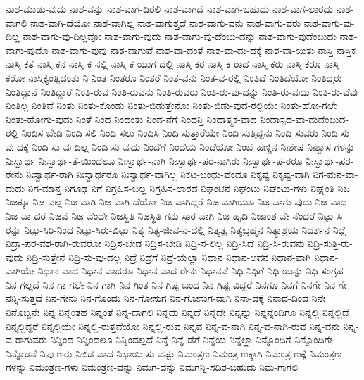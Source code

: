{ನಾಶ-ಮಾಡು-ವುದು
ನಾಶ-ವನ್ನು
ನಾಶ-ವಾಗ-ದಿರಲಿ
ನಾಶ-ವಾಗದೆ
ನಾಶ-ವಾಗ-ಬಹುದು
ನಾಶ-ವಾಗ-ಲಾರದು
ನಾಶ-ವಾಗಲಿ
ನಾಶ-ವಾಗಿ-ದೆಯೋ
ನಾಶ-ವಾಗಿಲ್ಲ
ನಾಶ-ವಾಗುತ್ತದೆ
ನಾಶ-ವಾಗು-ವನು
ನಾಶ-ವಾಗು-ವರು
ನಾಶ-ವಾಗು-ವು-ದಿಲ್ಲ
ನಾಶ-ವಾಗು-ವು-ದಿಲ್ಲವೋ
ನಾಶ-ವಾಗು-ವುದು
ನಾಶ-ವಾಗು-ವು-ದೆಂಬು-ದನ್ನು
ನಾಶ-ವಾಗು-ವುದೆಂಬುದು
ನಾಶ-ವಾಗು-ವುದೊ
ನಾಶ-ವಾಗು-ವುವು
ನಾಶ-ವಾಗುವೆ
ನಾಶ-ವಾ-ದಂತೆ
ನಾಶ-ವಾ-ದು-ದಕ್ಕೆ
ನಾಶ-ವಾ-ಯಿತು
ನಾಸ್ತಿ
ನಾಸ್ತಿಕ
ನಾಸ್ತಿ-ಕತೆ
ನಾಸ್ತಿ-ಕನ
ನಾಸ್ತಿ-ಕ-ನಲ್ಲಿ
ನಾಸ್ತಿ-ಕ-ಯುಗ-ದಲ್ಲಿ
ನಾಸ್ತಿ-ಕರ
ನಾಸ್ತಿ-ಕ-ರಾದ
ನಾಸ್ತಿ-ಕರು
ನಾಸ್ತಿ-ಕರೂ
ನಾಸ್ತಿ-ಕರೋ
ನಾಸ್ತಿಕ್ಯಂತ್ವಿದಂತು
ನಿ
ನಿಂತ
ನಿಂತರೂ
ನಿಂತರೆ
ನಿಂತ-ವನು
ನಿಂತ-ವ-ರಲ್ಲಿ
ನಿಂತಿದೆ
ನಿಂತಿದೆಯೋ
ನಿಂತಿದ್ದರು
ನಿಂತಿದ್ದಾನೆ
ನಿಂತಿದ್ದಾರೆ
ನಿಂತಿ-ರುವ
ನಿಂತಿ-ರುವನು
ನಿಂತಿ-ರುವರು
ನಿಂತಿ-ರು-ವು-ದನ್ನು
ನಿಂತಿ-ರು-ವುದು
ನಿಂತಿ-ರು-ವೆವು
ನಿಂತಿಲ್ಲ
ನಿಂತಿವೆ
ನಿಂತು
ನಿಂತು-ಕೊಂಡು
ನಿಂತು-ಬಿಡುತ್ತೇನೋ
ನಿಂತು-ಬಿಡು-ವುದ-ರಲ್ಲಿಯೇ
ನಿಂತು-ಹೋ-ಗಲೇ
ನಿಂತು-ಹೋಗು-ವುದು
ನಿಂತೆ
ನಿಂದ
ನಿಂದಂತು
ನಿಂದ-ನೆಗೆ
ನಿಂದನ್ತಿ
ನಿಂದಾತ್ಮಕ-ವಾದ
ನಿಂದಾಸ್ಪದ-ವಾ-ದುದೆಂಬುದ-ರಲ್ಲಿ
ನಿಂದಿಸ-ಬೇಡಿ
ನಿಂದಿ-ಸಲಿ
ನಿಂದಿ-ಸಲು
ನಿಂದಿಸಿ
ನಿಂದಿ-ಸುತ್ತಾರೆಯೇ
ನಿಂದಿ-ಸುತ್ತಿದ್ದನು
ನಿಂದಿ-ಸುವರು
ನಿಂದಿ-ಸು-ವು-ದಕ್ಕೆ
ನಿಂದಿ-ಸು-ವು-ದಿಲ್ಲ
ನಿಂದಿ-ಸು-ವುದು
ನಿಂದೆಗೆ
ನಿಂದೆಯ
ನಿಂದೆಯೋ
ನಿಂಬೆ-ಹಣ್ಣಿನ
ನಿಃಶೇಷ
ನಿಃಶ್ವಾಸ-ಗಳನ್ನು
ನಿಃಸ್ವಾರ್ಥ
ನಿಃಸ್ವಾರ್ಥ-ತೆ-ಯಿಂದಲೂ
ನಿಃಸ್ವಾರ್ಥ-ನಾಗಿ
ನಿಃಸ್ವಾರ್ಥ-ಪರ-ನಾಗಿರು
ನಿಃಸ್ವಾರ್ಥ-ಪ-ರರೂ
ನಿಃಸ್ವಾರ್ಥ-ಪರ-ರೇನು
ನಿಃಸ್ವಾರ್ಥ-ರಾಗಿ
ನಿಃಸ್ವಾರ್ಥರೂ
ನಿಃಸ್ವಾರ್ಥ-ವಾಗಿಲ್ಲ
ನಿಕಟ-ಬಂಧು-ವೆಂದೂ
ನಿಕೃಷ್ಟ
ನಿಕೃಷ್ಟ-ವಾಗಿ
ನಿಗ-ಮನ-ವಾ-ದುದು
ನಿಗ-ಮಾನ್ತ
ನಿಗೂಢ
ನಿಗೆ
ನಿಗ್ರಹಿಸ-ಬಲ್ಲ
ನಿಗ್ರಹಿಸ-ಲಾರದ
ನಿಘಂಟಿನ
ನಿಘಂಟು
ನಿಘಂಟು-ಗಳು
ನಿಘ್ನಂತಿ
ನಿಜ
ನಿಜಕ್ಕೂ
ನಿಜ-ವಲ್ಲ
ನಿಜ-ವಾಗಿ
ನಿಜ-ವಾಗಿ-ದೆಯೋ
ನಿಜ-ವಾಗಿದ್ದರೆ
ನಿಜ-ವಾಗಿಯೂ
ನಿಜ-ವಾಗು-ವುದು
ನಿಜ-ವಾದ
ನಿಜ-ವಾ-ದರೆ
ನಿಜವೆ
ನಿಜ-ವೆಂದೇ
ನಿಜಸ್ಥಿತಿ
ನಿಜಸ್ಥಿತಿ-ಗನು-ಸಾರ-ವಾಗಿ
ನಿಜ-ಹೃದಿ
ನಿಜಾಂಶ-ವೇ-ನೆಂದರೆ
ನಿಟ್ಟು-ಸಿ-ರನ್ನು
ನಿಟ್ಟು-ಸಿರಿ-ನಿಂದ
ನಿಟ್ಟು-ಸಿರು-ಬಿಟ್ಟು
ನಿತ್ಯ
ನಿತ್ಯ-ಜೀವ-ನ-ದಲ್ಲಿ
ನಿತ್ಯತ್ವ
ನಿತ್ಯಬ್ರಹ್ಮನ
ನಿತ್ಯಾಶ್ರಯ
ನಿದರ್ಶನ
ನಿದ್ದೆ
ನಿದ್ರಾ-ಪರ-ವಶ-ರಾಗಿ-ರುವರೋ
ನಿದ್ರಿಸ-ಬೇಡ
ನಿದ್ರಿಸ-ಬೇಡಿ
ನಿದ್ರಿ-ಸ-ಲಿಲ್ಲ
ನಿದ್ರಿ-ಸಿದೆ
ನಿದ್ರಿ-ಸಿ-ರುವನು
ನಿದ್ರಿ-ಸುತ್ತಿ-ರು-ವುದು
ನಿದ್ರಿ-ಸುತ್ತೇನೆ
ನಿದ್ರಿ-ಸು-ವು-ದಲ್ಲ
ನಿದ್ರೆ
ನಿದ್ರೆಗೆ
ನಿದ್ರೆ-ಯೆಲ್ಲಾ
ನಿಧಾನ
ನಿಧಾನ-ಅವನ
ನಿಧಾನ-ವಾಗಿ
ನಿಧಾನ-ವಾಗಿಯೇ
ನಿಧಾನ-ವಾದ
ನಿಧಾನ-ವಾದರೂ
ನಿಧಾನ-ವಾದ-ರೇನು
ನಿಧಾನವೆ
ನಿಧಿ
ನಿಧಿಗೆ
ನಿಧಿ-ಯನ್ನು
ನಿಧಿ-ಸಂಗ್ರಹ
ನಿನ-ಗಲ್ಲದೆ
ನಿನ-ಗಾ-ಗಲೇ
ನಿನ-ಗಾಗಿ
ನಿನ-ಗಿಂತ
ನಿನ-ಗಿಷ್ಟ-ಬಂದ
ನಿನ-ಗಿಷ್ಟ-ವಿದ್ದರೆ
ನಿನಗೂ
ನಿನಗೆ
ನಿನಗೇ
ನಿನ-ಗೇ-ನನ್ನಿ-ಸುತ್ತದೆ
ನಿನ-ಗೇನು
ನಿನ-ಗೊಂದು
ನಿನ-ಗೋಸುಗ
ನಿನ-ಗೋಸುಗ-ವಾಗಿ
ನಿನಾ-ದಕ್ಕೆ
ನಿನಾದ-ದಿಂದ
ನಿನೇ
ನಿನೊಬ್ಬನೇ
ನಿನ್ನ
ನಿನ್ನಂತಹ
ನಿನ್ನಂತೆ
ನಿನ್ನ-ದಾಗಲಿ
ನಿನ್ನದು
ನಿನ್ನದೆ
ನಿನ್ನದೇ
ನಿನ್ನನ್ನು
ನಿನ್ನನ್ನೆಂದಿಗೂ
ನಿನ್ನಲ್ಲಿ
ನಿನ್ನಲ್ಲಿದೆ
ನಿನ್ನಲ್ಲಿದ್ದರೆ
ನಿನ್ನಲ್ಲಿಯೇ
ನಿನ್ನಲ್ಲಿ-ರುತ್ತವೆಯೋ
ನಿನ್ನಲ್ಲಿ-ರುವ
ನಿನ್ನವ
ನಿನ್ನ-ವ-ನಾಗಿ
ನಿನ್ನ-ವ-ನಾಗಿ-ರುವ
ನಿನ್ನ-ವನು
ನಿನ್ನ-ವ-ರಾಗುವರು
ನಿನ್ನಿಂದ
ನಿನ್ನಿಂದಲೂ
ನಿನ್ನಿಂದಲ್ಲದೆ
ನಿನ್ನೆ
ನಿನ್ನೆ-ಡೆಗೆ
ನಿನ್ನೆಯ
ನಿನ್ನೆಲ್ಲಾ
ನಿನ್ನೊಂದಿಗೆ
ನಿನ್ನೊಂದಿಗೇ
ನಿನ್ನೊಡನೆ
ನಿಪು-ಣರು
ನಿಬಿಡ-ವಾದ
ನಿಭಾಯಿ-ಸು-ವಷ್ಟು
ನಿಮಂತ್ರಣ
ನಿಮಂತ್ರ-ಣಕ್ಕಾಗಿ
ನಿಮಂತ್ರ-ಣಕ್ಕೆ
ನಿಮಂತ್ರಣ-ಗಳನ್ನು
ನಿಮಂತ್ರಣ-ಗಳು
ನಿಮಂತ್ರಣ-ವನ್ನು
ನಿಮಗ-ದನ್ನು
ನಿಮಗನ್ನಿ-ಸದಿರ-ಬಹುದು
ನಿಮ-ಗಾಗಲಿ
}
